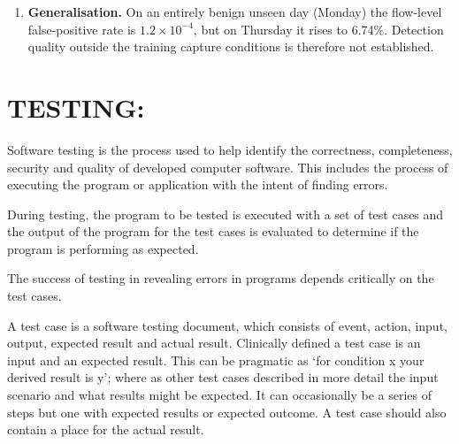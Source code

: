 \documentclass[12pt,a4paper]{report}
\begin{document}
\begin{enumerate}
\begin{itemize}
        \item Resetting the host memory before every window raises the macro F1 slightly (test $+0.0188$, validation $+0.0444$; before the correction, test $+0.1270$). This is consistent with the untrained GRU memory described in Chapter~5.
        \item These probes perturb an already-trained model and are not retrained ablations.
    \end{itemize}
    \item \textbf{Generalisation.} On an entirely benign unseen day (Monday) the flow-level false-positive rate is $1.2\times10^{-4}$, but on Thursday it rises to 6.74\%. Detection quality outside the training capture conditions is therefore not established.
\end{enumerate}

\section{TESTING:}
 \par Software testing is the process used to help identify the correctness, completeness, security and quality of developed computer software. This includes the process of executing the program or application with the intent of finding errors.

\par During testing, the program to be tested is executed with a set of test cases and the output of the program for the test cases is evaluated to determine if the program is performing as expected.

\par The success of testing in revealing errors in programs depends critically on the test cases.

\par A test case is a software testing document, which consists of event, action, input, output, expected result and actual result. Clinically defined a test case is an input and an expected result. This can be pragmatic as `for condition x your derived result is y'; where as other test cases described in more detail the input scenario and what results might be expected. It can occasionally be a series of steps but one with expected results or expected outcome. A test case should also contain a place for the actual result.
\end{document}
